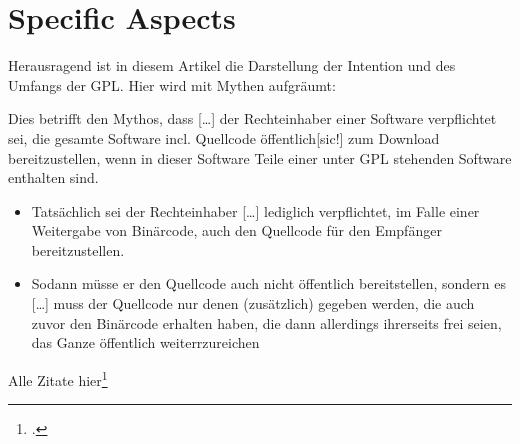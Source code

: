 \documentclass[DIV=calc,BCOR=5mm,11pt,headings=small,oneside,abstract=true, toc=bib]{scrartcl}
\begin{document}
\section{Specific Aspects}

Herausragend ist in diesem Artikel die Darstellung der Intention und des Umfangs
der GPL. Hier wird mit Mythen aufgräumt:

Dies betrifft den Mythos, dass \glqq{}[\ldots] der Rechteinhaber einer
Software verpflichtet sei, die gesamte Software incl. Quellcode
öffentlich[sic!] zum Download bereitzustellen, wenn in dieser Software
Teile einer unter GPL stehenden Software enthalten sind\grqq{}.

\begin{itemize}
  \item Tatsächlich sei \glqq{}der Rechteinhaber [\ldots] lediglich
  verpflichtet, im Falle einer Weitergabe von Binärcode, auch den
  Quellcode für den Empfänger bereitzustellen\grqq{}.
  \item Sodann müsse er den Quellcode auch nicht \glqq{}öffentlich\grqq{}
  bereitstellen, sondern es \glqq{}[\ldots] muss der Quellcode nur denen
  (zusätzlich) gegeben werden, die auch zuvor den Binärcode erhalten
  haben\grqq{}, die dann allerdings ihrerseits frei seien, das Ganze öffentlich
  weiterrzureichen
\end{itemize}

Alle Zitate hier\footcite[vgl.][181]{BreGlaGra2008a}


\small

\end{document}
